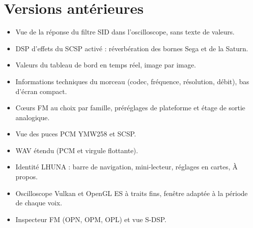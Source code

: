 \section*{Versions antérieures}
\begin{itemize}
  \item Vue de la réponse du filtre SID dans l'oscilloscope, sans texte de valeurs.
  \item DSP d'effets du SCSP activé : réverbération des bornes Sega et de la Saturn.
  \item Valeurs du tableau de bord en temps réel, image par image.
  \item Informations techniques du morceau (codec, fréquence, résolution, débit), bas d'écran compact.
  \item Cœurs FM au choix par famille, préréglages de plateforme et étage de sortie analogique.
  \item Vue des puces PCM YMW258 et SCSP.
  \item WAV étendu (PCM et virgule flottante).
  \item Identité LHUNA : barre de navigation, mini-lecteur, réglages en cartes, À propos.
  \item Oscilloscope Vulkan et OpenGL ES à traits fins, fenêtre adaptée à la période de chaque voix.
  \item Inspecteur FM (OPN, OPM, OPL) et vue S-DSP.
\end{itemize}
